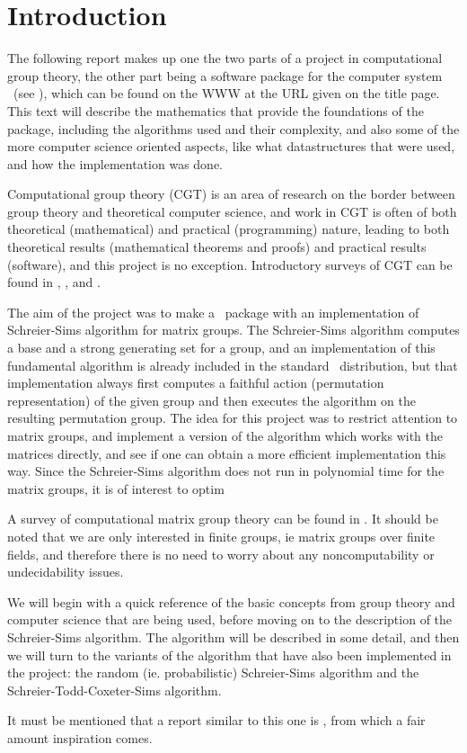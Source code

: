 \chapter{Introduction}
The following report makes up one the two parts of a project in
computational group theory, the other part being a software package
for the computer system \GAP~(see \cite{GAP}), which can be found on
the WWW at the URL given on the title page. This text will describe the mathematics that
provide the foundations of the package, including the algorithms used and their complexity,
and also some of the more computer science oriented aspects, like what
datastructures that were used, and how the implementation was done.

Computational group theory (CGT) is an area of research on the border
between group theory and theoretical computer science, and work in CGT
is often of both theoretical (mathematical) and practical
(programming) nature, leading to both theoretical results
(mathematical theorems and proofs) and practical results (software),
and this project is no exception. Introductory surveys of CGT can be
found in \cite{sims98}, \cite{seress97}, \cite{neubuser95} and \cite{cannon92}.

The aim of the project was to make a \GAP~package with an
implementation of Schreier-Sims algorithm for matrix groups. The Schreier-Sims algorithm computes a base and a strong generating set for a group, and an
implementation of this fundamental algorithm is already included in the
standard \GAP~distribution, but that implementation always first
computes a faithful action (permutation representation) of the given
group and then executes the algorithm on the resulting permutation
group. The idea for this project was to restrict attention to matrix
groups, and implement a version of the algorithm which works with the
matrices directly, and see if one can obtain a more efficient
implementation this way. Since the Schreier-Sims algorithm does not run in polynomial time for the matrix groups, it is of interest to optim

A survey of computational matrix group theory can be found in
\cite{niemeyer01}. It should be noted that we are only interested in
finite groups, ie matrix groups over finite fields, and therefore
there is no need to worry about any noncomputability or undecidability
issues.

We will begin with a quick reference of the basic concepts from group
theory and computer science that are being used, before moving on to the description of
the Schreier-Sims algorithm. The algorithm will be described in some
detail, and then we will turn to the variants of the algorithm that have also
been implemented in the project: the random (ie. probabilistic)
Schreier-Sims algorithm and the Schreier-Todd-Coxeter-Sims algorithm.

It must be mentioned that a report similar to this one is \cite{murray93}, from which a fair amount inspiration comes.
